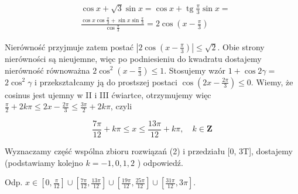 \documentclass[10pt]{article}
\begin{document}
$$
\begin{aligned}
& \cos x+\sqrt{3} \sin x=\cos x+\operatorname{tg} \frac{\pi}{3} \sin x= \\
& \frac{\cos x \cos \frac{\pi}{3}+\sin x \sin \frac{\pi}{3}}{\cos \frac{\pi}{3}}=2 \cos \left(x-\frac{\pi}{3}\right)
\end{aligned}
$$

Nierówność przyjmuje zatem postać $\left|2 \cos \left(x-\frac{\pi}{3}\right)\right| \leq \sqrt{2}$. Obie strony nierówności są nieujemne, więc po podniesieniu do kwadratu dostajemy nierówność równoważna $2 \cos ^{2}\left(x-\frac{\pi}{3}\right) \leq 1$. Stosujemy wzór $1+\cos 2 \gamma=$ $2 \cos ^{2} \gamma$ i przekształcamy ją do prostszej postaci $\cos \left(2 x-\frac{2 \pi}{3}\right) \leq 0$. Wiemy, że cosinus jest ujemny w II i III ćwiartce, otrzymujemy więc $\frac{\pi}{2}+2 k \pi \leq 2 x-\frac{2 \pi}{3} \leq \frac{3 \pi}{2}+2 k \pi$, czyli

$$
\frac{7 \pi}{12}+k \pi \leq x \leq \frac{13 \pi}{12}+k \pi, \quad k \in \mathbf{Z}
$$

Wyznaczamy część wspólna zbioru rozwiązań (2) i przedziału [0, 3T], dostajemy (podstawiamy kolejno $k=-1,0,1,2$ ) odpowiedź.

Odp. $x \in\left[0, \frac{\pi}{12}\right] \cup\left[\frac{7 \pi}{12}, \frac{13 \pi}{12}\right] \cup\left[\frac{19 \pi}{12}, \frac{25 \pi}{12}\right] \cup\left[\frac{31 \pi}{12}, 3 \pi\right]$.
\end{document}
